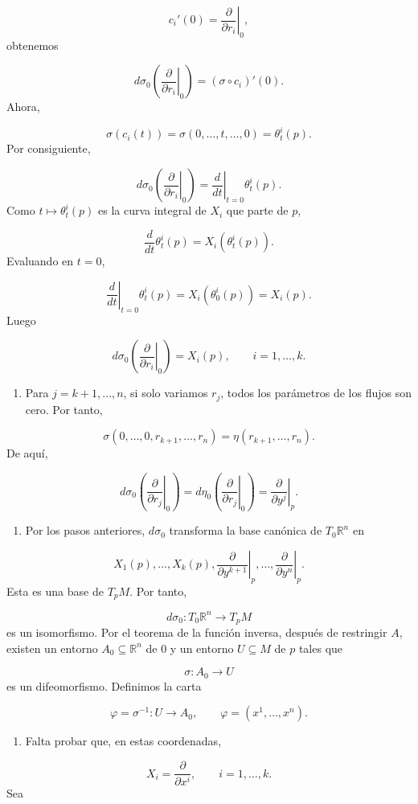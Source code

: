 \begin{bookproof}{}
\[
c_i'(0)=\left.\frac{\partial}{\partial r_i}\right|_0,
\]
obtenemos

\[
d\sigma_0\left(\left.\frac{\partial}{\partial r_i}\right|_0\right)=(\sigma\circ c_i)'(0).
\]
Ahora,

\[
\sigma(c_i(t))=\sigma(0,\ldots,t,\ldots,0)=\theta_t^i(p).
\]
Por consiguiente,

\[
d\sigma_0\left(\left.\frac{\partial}{\partial r_i}\right|_0\right)=\left.\frac{d}{dt}\right|_{t=0}\theta_t^i(p).
\]
Como $t\mapsto\theta_t^i(p)$ es la curva integral de $X_i$ que parte de $p$,

\[
\frac{d}{dt}\theta_t^i(p)=X_i(\theta_t^i(p)).
\]
Evaluando en $t=0$,

\[
\left.\frac{d}{dt}\right|_{t=0}\theta_t^i(p)=X_i(\theta_0^i(p))=X_i(p).
\]
Luego

\[
d\sigma_0\left(\left.\frac{\partial}{\partial r_i}\right|_0\right)=X_i(p),\qquad i=1,\ldots,k.
\]
\begin{enumerate}[start=7]
\item Para $j=k+1,\ldots,n$, si solo variamos $r_j$, todos los parámetros de los flujos son cero. Por tanto,
\end{enumerate}
\[
\sigma(0,\ldots,0,r_{k+1},\ldots,r_n)=\eta(r_{k+1},\ldots,r_n).
\]
De aquí,

\[
d\sigma_0\left(\left.\frac{\partial}{\partial r_j}\right|_0\right)=d\eta_0\left(\left.\frac{\partial}{\partial r_j}\right|_0\right)=\left.\frac{\partial}{\partial y^j}\right|_p.
\]
\begin{enumerate}[start=8]
\item Por los pasos anteriores, $d\sigma_0$ transforma la base canónica de $T_0\mathbb R^n$ en
\end{enumerate}
\[
X_1(p),\ldots,X_k(p),\left.\frac{\partial}{\partial y^{k+1}}\right|_p,\ldots,\left.\frac{\partial}{\partial y^n}\right|_p.
\]
Esta es una base de $T_pM$. Por tanto,

\[
d\sigma_0:T_0\mathbb R^n\longrightarrow T_pM
\]
es un isomorfismo. Por el teorema de la función inversa, después de restringir $A$, existen un entorno $A_0\subseteq\mathbb R^n$ de $0$ y un entorno $U\subseteq M$ de $p$ tales que

\[
\sigma:A_0\longrightarrow U
\]
es un difeomorfismo. Definimos la carta

\[
\varphi=\sigma^{-1}:U\longrightarrow A_0,\qquad \varphi=(x^1,\ldots,x^n).
\]
\begin{enumerate}[start=9]
\item Falta probar que, en estas coordenadas,
\end{enumerate}
\[
X_i=\frac{\partial}{\partial x^i},\qquad i=1,\ldots,k.
\]
Sea


\end{bookproof}

